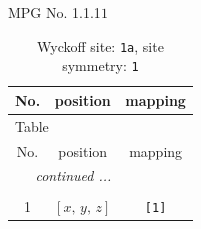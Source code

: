 \documentclass[fleqn,8pt]{jsarticle}
\begin{document}
\setcounter{MaxMatrixCols}{32}

\renewcommand{\tablename}{Table~}
\renewcommand{\figurename}{Figure~}
\begin{center}
\LARGE
MPG No. 1.1.1\quad$1$
\end{center}
\renewcommand{\arraystretch}{1.2}
\begin{longtable}{ccc}
\caption{Wyckoff site: {\tt 1a}, site symmetry: {\tt 1}}
 \\
 \hline \hline
No. & position & mapping \\ \hline \endfirsthead

\multicolumn{2}{l}{\tablename\ \thetable{}} \\
 \hline \hline
No. & position & mapping \\ \hline \endhead

 \hline \hline
\multicolumn{2}{r}{\footnotesize\it continued ...} \\ \endfoot

 \hline \hline
\multicolumn{2}{r}{} \\ \endlastfoot

1 & $\left[ x,\, y,\, z \right]$ & {\tt [1]} \\
\end{longtable}
\end{document}
